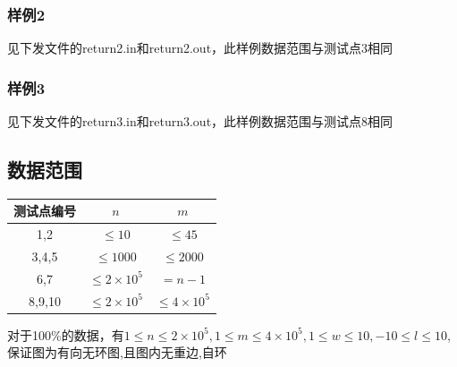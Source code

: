 \documentclass[12pt]{ctexart}
\begin{document}
\subsubsection{样例2}
见下发文件的return2.in和return2.out，此样例数据范围与测试点3相同
\subsubsection{样例3}
见下发文件的return3.in和return3.out，此样例数据范围与测试点8相同
\subsection{数据范围}
\begin{center}
	\begin{tabular}{|c|c|c|}
		\hline 测试点编号&$n$&$m$\\
		\hline 1,2&$\le10$&$\le45$\\
		\hline 3,4,5&$\le1000$&$\le2000$\\
		\hline 6,7&$\le2\times10^5$&$=n-1$\\
		\hline 8,9,10&$\le2\times10^5$&$\le4\times10^5$\\
		\hline
	\end{tabular}
\end{center}
对于100\%的数据，有$1\le n\le2\times10^5,1\le m\le4\times10^5,1\le w\le10,-10\le l\le10$,保证图为有向无环图,且图内无重边,自环
\end{document}
